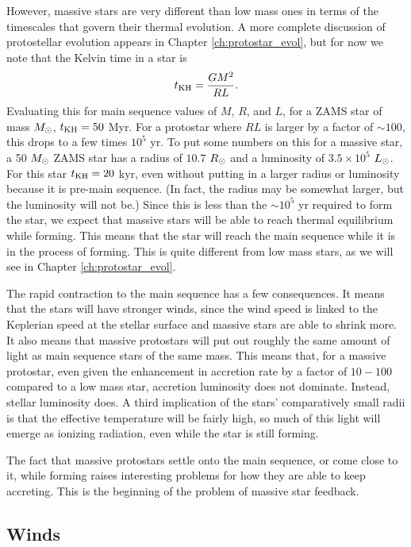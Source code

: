 However, massive stars are very different than low mass ones in terms of the timescales that govern their thermal evolution. A more complete discussion of protostellar evolution appears in Chapter \ref{ch:protostar_evol}, but for now we note that the Kelvin time in a star is
\begin{equation}
t_{\rm KH} = \frac{GM^2}{RL}.
\end{equation}
Evaluating this for main sequence values of $M$, $R$, and $L$, for a ZAMS star of mass $M_{\odot}$, $t_{\rm KH} = 50$ Myr.  For a protostar where $RL$ is larger by a factor of $\sim 100$, this drops to a few times $10^5$ yr. To put some numbers on this for a massive star, a 50 $M_{\odot}$ ZAMS star has a radius of $10.7$ $R_{\odot}$ and a luminosity of $3.5\times 10^5$ $L_{\odot}$. For this star $t_{\rm KH}=20$ kyr, even without putting in a larger radius or luminosity because it is pre-main sequence. (In fact, the radius may be somewhat larger, but the luminosity will not be.) Since this is less than the $\sim 10^5$ yr required to form the star, we expect that massive stars will be able to reach thermal equilibrium while forming. This means that the star will reach the main sequence while it is in the process of forming. This is quite different from low mass stars, as we will see in Chapter \ref{ch:protostar_evol}.

The rapid contraction to the main sequence has a few consequences. It means that the stars will have stronger winds, since the wind speed is linked to the Keplerian speed at the stellar surface and massive stars are able to shrink more. It also means that massive protostars will put out roughly the same amount of light as main sequence stars of the same mass. This means that, for a massive protostar, even given the enhancement in accretion rate by a factor of $10-100$ compared to a low mass star, accretion luminosity does not dominate. Instead, stellar luminosity does. A third implication of the stars' comparatively small radii is that the effective temperature will be fairly high, so much of this light will emerge as ionizing radiation, even while the star is still forming.

The fact that massive protostars settle onto the main sequence, or come close to it, while forming raises interesting problems for how they are able to keep accreting. This is the beginning of the problem of massive star feedback.

\subsection{Winds}

